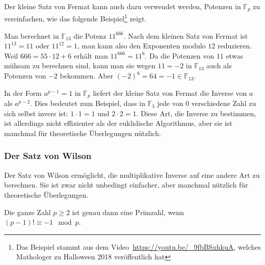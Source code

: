 Der kleine Satz von Fermat kann auch dazu verwendet werden, Potenzen 
in $\mathbb{F}_p$ zu vereinfachen, wie das folgende Beispiel\footnote{%
Das Beispiel stammt aus dem Video~\url{https://youtu.be/_9fbBSxhkuA},
welches Mathologer zu Halloween 2018 veröffentlich hat}
zeigt.

\begin{beispiel}
Man berechnet in $\mathbb{F}_{13}$ die Potenz $11^{666}$.
Nach dem kleinen Satz von Fermat ist $11^{13} = 11$ oder $11^{12}=1$,
man kann also den Exponenten modulo $12$ reduzieren.
Weil $666=55\cdot 12 + 6$ erhält man $11^{666}= 11^6$.
Da die Potenzen von $11$ etwas mühsam zu berechnen sind,
kann man sie wegen $11=-2$ in $\mathbb{F}_{13}$ auch als Potenzen
von $-2$ bekommen.
Aber $(-2)^6 = 64 = -1 \in\mathbb{F}_{13}$.
\end{beispiel}

In der Form $a^{p-1}=1$ in $\mathbb{F}_p$ liefert der kleine Satz
von Fermat die Inverse von $a$ als $a^{p-2}$.
Dies bedeutet zum Beispiel, dass in $\mathbb{F}_3$ jede von $0$
verschiedene Zahl zu sich selbst invers ist: $1\cdot 1=1$ und $2\cdot 2=1$.
Diese Art, die Inverse zu bestimmen, ist allerdings nicht effizienter
als der euklidische Algorithmus, aber sie ist manchmal für
theoretische Überlegungen nützlich.

\subsubsection{Der Satz von Wilson}
Der Satz von Wilson ermöglicht, die multiplikative Inverse auf eine
andere Art zu berechnen.
Sie ist zwar nicht unbedingt einfacher, aber manchmal nützlich für
theoretische Überlegungen.

\begin{satz}[Wilson]
%
%
Die ganze Zahl $p\ge 2$ ist genau dann eine Primzahl, wenn
$(p-1)!\equiv -1\mod p$.
\end{satz}

